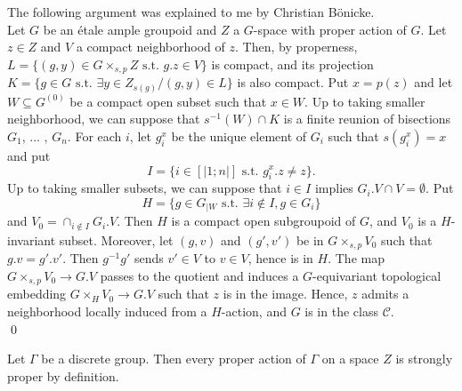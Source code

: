 \begin{dem} The following argument was explained to me by Christian Bönicke.\\ 
Let $G$ be an étale ample groupoid and $Z$ a $G$-space with proper action of $G$. Let $z\in Z$ and $V$ a compact neighborhood of $z$. Then, by properness, $L = \{(g,y)\in G\times_{s,p} Z \text{ s.t. } g.z\in V \}$ is compact, and its projection $K = \{g\in G \text{ s.t. } \exists  y\in Z_{s(g)} / (g,y)\in L\}$ is also compact. Put $x=p(z)$ and let $W\subseteq G^{(0)}$ be a compact open subset such that $x\in W$. Up to taking smaller neighborhood, we can suppose that $s^{-1}(W)\cap K$ is a finite reunion of bisections $G_1$, ... , $G_n$. For each $i$, let $g_i^x$ be the unique element of $G_i$ such that $s(g_i^x)=x$ and put
\[I = \{i\in [|1;n|] \text{ s.t. } g_i^x . z \neq z\}.\]
Up to taking smaller subsets, we can suppose that $i\in I$ implies $G_i. V \cap V = \emptyset$. Put 
\[H = \{g\in G_{|W} \text{ s.t. } \exists i\notin I, g\in G_i \}\]
and $V_0 = \cap_{i\notin I} G_i.V$. Then $H$ is a compact open subgroupoid of $G$, and $V_0$ is a $H$-invariant subset. 
Moreover, let $(g,v)$ and $(g',v')$ be in $G\times_{s,p} V_0$ such that $g.v=g'.v'$. Then $g^{-1}g'$ sends $v'\in V$ to $v\in V$, hence is in $H$. The map $G\times_{s,p} V_0\rightarrow G.V$ passes to the quotient and induces a $G$-equivariant topological embedding $G\times_H V_0 \rightarrow G.V$ such that $z$ is in the image. Hence, $z$ admits a neighborhood locally induced from a $H$-action, and $G$ is in the class $\mathcal C$.\\   
\qed
\end{dem}

\begin{rk}
Let $\Gamma$ be a discrete group. Then every proper action of $\Gamma$ on a space $Z$ is strongly proper by definition.
\end{rk}




